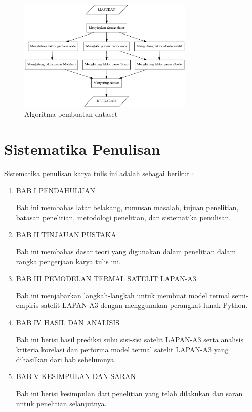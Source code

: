 \begin{figure}[H]
\setlength{}
\begin{center}
\includegraphics[width=0.75\textwidth]{fig/graph_algoritma.png}
\caption{Algoritma pembuatan dataset}
\label{fig:algoritma}
\end{center}
\end{figure}

\section{Sistematika Penulisan}

Sistematika penulisan karya tulis ini adalah sebagai berikut :

\begin{enumerate}
\item BAB I PENDAHULUAN

Bab ini membahas latar belakang, rumusan masalah, tujuan penelitian, batasan
penelitian, metodologi penelitian, dan sistematika penulisan.

\item BAB II TINJAUAN PUSTAKA

Bab ini membahas dasar teori yang digunakan dalam penelitian dalam rangka
pengerjaan karya tulis ini.

\item BAB III PEMODELAN TERMAL SATELIT LAPAN-A3

Bab ini menjabarkan langkah-langkah untuk membuat model termal semi-empiris
satelit LAPAN-A3 dengan menggunakan perangkat lunak Python.

\item BAB IV HASIL DAN ANALISIS

Bab ini berisi hasil prediksi suhu sisi-sisi satelit LAPAN-A3 serta analisis
kriteria korelasi dan performa model termal satelit LAPAN-A3 yang dihasilkan
dari bab sebelumnya.

\item BAB V KESIMPULAN DAN SARAN

Bab ini berisi kesimpulan dari penelitian yang telah dilakukan dan saran
untuk penelitian selanjutnya.
\end{enumerate}
